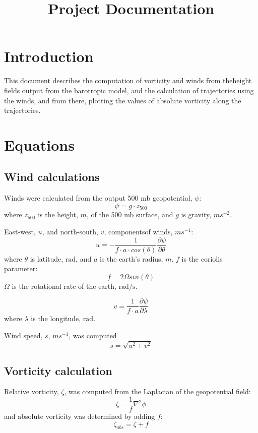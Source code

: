 \documentclass{article}
\begin{document}
\title{Project Documentation}
\section{Introduction}
This document describes the computation of vorticity and winds from theheight fields output from the barotropic model, and the calculation of trajectories using the winds, and from there, plotting the values of absolute vorticity along the trajectories.

\section{Equations}

\subsection{Wind calculations}
Winds were calculated from the output 500 mb geopotential, $\psi$:
\begin{equation}
  \psi = g \cdot z_{500}
\end{equation}
where $z_{500}$ is the height, $m$, of the 500 mb surface, and $g$ is
gravity, $ms^{-2}$.

East-west, $u$, and north-south, $v$, componentsof winds, $ms^{-1}$:
\begin{equation}
u  = - \frac{1}{f \cdot a \cdot cos(\theta)}\frac{\partial \psi}{\partial \theta}
\end{equation}
where $\theta$ is latitude, $\text{rad}$, and $a$ is the earth's radius, $m$.
$f$ is the coriolis parameter:
\begin{equation}
  f = 2 \Omega sin(\theta)
\end{equation}
$\Omega$ is the rotational rate of the earth, $\text{rad/s}$.

\begin{equation}
v  =  \frac{1}{f \cdot a }\frac{\partial \psi}{\partial \lambda}
\end{equation}
 where $\lambda$ is the longitude, $\text{rad}$.

Wind speed, $s$, $m s^{-1}$, was computed
 \begin{equation}
   s = \sqrt{u^2 + v^2}
   \end{equation}

\subsection{Vorticity calculation}
 Relative vorticity, $\zeta$, was computed from the Laplacian of the geopotential field:
 \begin{equation}
   \zeta = \frac{1}{f}\nabla^{2}\phi
 \end{equation}
 and absolute vorticity was determined by adding $f$:
 \begin{equation}
   \zeta_{abs} = \zeta + f
 \end{equation}
 
\end{document}
